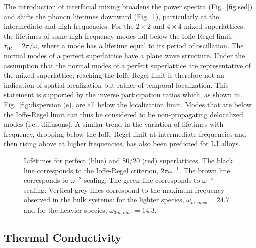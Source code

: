 \documentclass[aps,prb,preprint,preprintnumbers,amsmath,amssymb,floatfix,superscriptaddress]{revtex4}
\begin{document}
The introduction of interfacial mixing broadens the power spectra (Fig.~\ref{fig:sed}) and shifts the phonon lifetimes downward (Fig.~\ref{FIG:lifetime}), particularly at the intermediate and high frequencies. For the $2 \times 2$ and $ 4 \times 4$ mixed superlattices,  the lifetimes of some high-frequency modes fall below the Ioffe-Regel limit, $\tau_\mathrm{IR} =2\pi/\omega$, where a mode has a lifetime equal to its period of oscillation. The normal modes of a perfect superlattice have a plane wave structure. Under the assumption that the normal modes of a perfect superlattice are representative of the mixed superlattice, reaching the Ioffe-Regel limit is therefore not an indication of spatial localization but rather of temporal localization. This statement is supported by the inverse participation ratios which, as shown in Fig.~\ref{fig:dispersion}(e), are all below the localization limit. Modes that are below the Ioffe-Regel limit can thus be considered to be non-propagating delocalized modes (i.e., diffusons).\cite{allen_thermal_1993,allen1999diffusons} A similar trend in the variation of lifetimes with frequency, dropping below the Ioffe-Regel limit at intermediate frequencies and then rising above at higher frequencies, has also been predicted for LJ alloys.\cite{larkin2013predicting} 

\renewcommand{\textfraction}{0.0}
\begin{figure}%
\begin{center}
\renewcommand{\figure}{Fig.}
\caption{Lifetimes for perfect (blue) and 80/20 (red) superlattices. The black line corresponds to the Ioffe-Regel criterion, $2\pi\omega^{-1}$. The brown line corresponds to $\omega^{-2}$ scaling. The green line corresponds to $\omega^{-4}$ scaling. Vertical grey lines correspond to the maximum frequency observed in the bulk systems: for the lighter species, $\omega_{m,max}=24.7$ and for the heavier species, $\omega_{3m,max}=14.3$. } 
\label{FIG:lifetime}
\end{center}
\end{figure}

\subsection{Thermal Conductivity}
\end{document}
